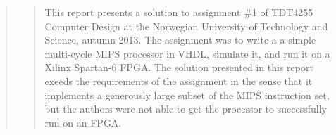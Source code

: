 \begin{quote}
\begin{quote}
This report presents a solution to assignment \#1 of TDT4255 Computer Design at the Norwegian University of Technology and Science, autumn 2013.
The assignment was to write a a simple multi-cycle MIPS processor in VHDL, simulate it, and run it on a Xilinx Spartan-6 FPGA.
The solution presented in this report exeeds the requirements of the assignment in the sense that it implements a generously large subset of the MIPS instruction set, but the authors were not able to get the processor to successfully run on an FPGA.
\end{quote}
\end{quote}
